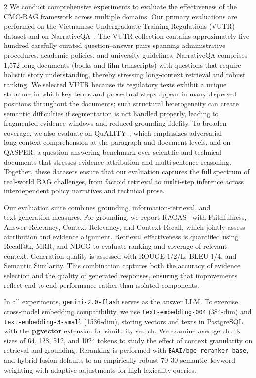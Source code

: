 \documentclass[10pt,letterpaper]{article}
\let\cite\citep
\begin{document}
\begin{multicols}{2}
We conduct comprehensive experiments to evaluate the effectiveness of the CMC‑RAG framework across multiple domains. Our primary evaluations are performed on the Vietnamese Undergraduate Training Regulations (VUTR) dataset and on NarrativeQA~\cite{kocisky2017narrativeqa}. The VUTR collection contains approximately five hundred carefully curated question–answer pairs spanning administrative procedures, academic policies, and university guidelines. NarrativeQA comprises 1,572 long documents (books and film transcripts) with questions that require holistic story understanding, thereby stressing long‑context retrieval and robust ranking. We selected VUTR because its regulatory texts exhibit a unique structure in which key terms and procedural steps appear in many dispersed positions throughout the documents; such structural heterogeneity can create semantic difficulties if segmentation is not handled properly, leading to fragmented evidence windows and reduced grounding fidelity. To broaden coverage, we also evaluate on QuALITY~\cite{bowman2022quality}, which emphasizes adversarial long‑context comprehension at the paragraph and document levels, and on QASPER, a question‑answering benchmark over scientific and technical documents that stresses evidence attribution and multi‑sentence reasoning. Together, these datasets ensure that our evaluation captures the full spectrum of real‑world RAG challenges, from factoid retrieval to multi‑step inference across interdependent policy narratives and technical prose.

Our evaluation suite combines grounding, information‑retrieval, and text‑generation measures. For grounding, we report RAGAS~\cite{Es2025Ragas} with Faithfulness, Answer Relevancy, Context Relevancy, and Context Recall, which jointly assess attribution and evidence alignment. Retrieval effectiveness is quantified using Recall@k, MRR, and NDCG to evaluate ranking and coverage of relevant context. Generation quality is assessed with ROUGE‑1/2/L, BLEU‑1/4, and Semantic Similarity. This combination captures both the accuracy of evidence selection and the quality of generated responses, ensuring that improvements reflect end‑to‑end performance rather than isolated components.

In all experiments, \texttt{gemini‑2.0‑flash} serves as the answer LLM. To exercise cross‑model embedding compatibility, we use \texttt{text‑embedding‑004} (384‑dim) and \texttt{text‑embedding‑3‑small} (1536‑dim), storing vectors and texts in PostgreSQL with the \textbf{pgvector} extension for similarity search. We examine average chunk sizes of 64, 128, 512, and 1024 tokens to study the effect of context granularity on retrieval and grounding. Reranking is performed with \texttt{BAAI/bge‑reranker‑base}, and hybrid fusion defaults to an empirically robust 70–30 semantic–keyword weighting with adaptive adjustments for high‑lexicality queries.


\end{multicols}
\end{document}
